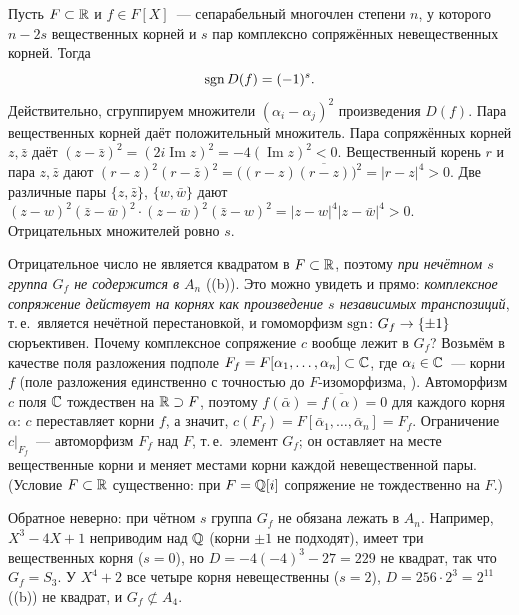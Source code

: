 \begin{remark}[4.3]
Пусть $F\subset\mathbb R$ и $f\in F[X]$~--- сепарабельный многочлен степени $n$, у которого $n-2s$ вещественных корней и $s$
пар комплексно сопряжённых невещественных корней. Тогда
\[
\operatorname{sgn} D(f)=(-1)^s .
\]
Действительно, сгруппируем множители $(\alpha_i-\alpha_j)^2$ произведения $D(f)$. Пара вещественных корней даёт
положительный множитель. Пара сопряжённых корней $z,\bar z$ даёт $(z-\bar z)^2=(2i\operatorname{Im}z)^2=-4(\operatorname{Im}z)^2<0$.
Вещественный корень $r$ и пара $z,\bar z$ дают $(r-z)^2(r-\bar z)^2=\bigl((r-z)\overline{(r-z)}\bigr)^2=|r-z|^4>0$. Две
различные пары $\{z,\bar z\}$, $\{w,\bar w\}$ дают
$(z-w)^2(\bar z-\bar w)^2\cdot(z-\bar w)^2(\bar z-w)^2=|z-w|^4|z-\bar w|^4>0$. Отрицательных множителей ровно $s$.

Отрицательное число не является квадратом в $F\subset\mathbb R$, поэтому \emph{при нечётном $s$ группа $G_f$ не содержится в
$A_n$} ((b)). Это можно увидеть и прямо: \emph{комплексное сопряжение действует на корнях как произведение $s$
независимых транспозиций}, т.\,е.\ является нечётной перестановкой, и гомоморфизм $\operatorname{sgn}\colon G_f\to\{\pm1\}$ сюръективен.
Почему комплексное сопряжение $c$ вообще лежит в $G_f$? Возьмём в качестве поля разложения подполе
$F_f=F[\alpha_1,\dots,\alpha_n]\subset\mathbb C$, где $\alpha_i\in\mathbb C$~--- корни $f$ (поле разложения единственно с точностью до
$F$-изоморфизма, ). Автоморфизм $c$ поля $\mathbb C$ тождествен на $\mathbb R\supset F$, поэтому $f(\bar\alpha)=\overline{f(\alpha)}=0$
для каждого корня $\alpha$: $c$ переставляет корни $f$, а значит, $c(F_f)=F[\bar\alpha_1,\dots,\bar\alpha_n]=F_f$. Ограничение
$c|_{F_f}$~--- автоморфизм $F_f$ над $F$, т.\,е.\ элемент $G_f$; он оставляет на месте вещественные корни и меняет местами
корни каждой невещественной пары. (Условие $F\subset\mathbb R$ существенно: при $F=\mathbb Q[i]$ сопряжение не тождественно на $F$.)

Обратное неверно: при чётном $s$ группа $G_f$ не обязана лежать в $A_n$. Например, $X^3-4X+1$ неприводим над $\mathbb Q$ (корни
$\pm1$ не подходят), имеет три вещественных корня ($s=0$), но $D=-4(-4)^3-27=229$ не квадрат, так что $G_f=S_3$. У
$X^4+2$ все четыре корня невещественны ($s=2$), $D=256\cdot2^3=2^{11}$ ((b)) не квадрат, и $G_f\not\subset A_4$.
\end{remark}

